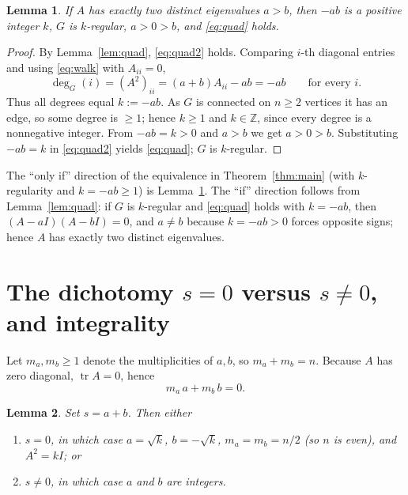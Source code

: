 \documentclass{amsart}
\newtheorem{lemma}{Lemma}
\theoremstyle{definition}
\begin{document}
\begin{lemma}\label{lem:regular}
If $A$ has exactly two distinct eigenvalues $a>b$, then $-ab$ is a positive
integer $k$, $G$ is $k$-regular, $a>0>b$, and \eqref{eq:quad} holds.
\end{lemma}

\begin{proof}
By Lemma~\ref{lem:quad}, \eqref{eq:quad2} holds. Comparing $i$-th diagonal
entries and using \eqref{eq:walk} with $A_{ii}=0$,
\[
\deg_G(i)=(A^2)_{ii}=(a+b)A_{ii}-ab=-ab\qquad\text{for every }i .
\]
Thus all degrees equal $k:=-ab$. As $G$ is connected on $n\ge2$ vertices it has
an edge, so some degree is $\ge1$; hence $k\ge1$ and $k\in\mathbb Z$, since
every degree is a nonnegative integer. From $-ab=k>0$ and $a>b$ we get
$a>0>b$. Substituting $-ab=k$ in \eqref{eq:quad2} yields \eqref{eq:quad}; $G$
is $k$-regular.
\end{proof}

The ``only if'' direction of the equivalence in Theorem~\ref{thm:main} (with
$k$-regularity and $k=-ab\ge1$) is Lemma~\ref{lem:regular}. The ``if''
direction follows from Lemma~\ref{lem:quad}: if $G$ is $k$-regular and
\eqref{eq:quad} holds with $k=-ab$, then $(A-aI)(A-bI)=0$, and $a\ne b$ because
$k=-ab>0$ forces opposite signs; hence $A$ has exactly two distinct
eigenvalues.

\section{The dichotomy $s=0$ versus $s\ne0$, and integrality}\label{sec:dichotomy}

Let $m_a,m_b\ge1$ denote the multiplicities of $a,b$, so $m_a+m_b=n$. Because
$A$ has zero diagonal, $\operatorname{tr}A=0$, hence
\begin{equation}\label{eq:trace}
m_a\,a+m_b\,b=0 .
\end{equation}

\begin{lemma}\label{lem:dichotomy}
Set $s=a+b$. Then either
\begin{enumerate}
\item[(I)] $s=0$, in which case $a=\sqrt k$, $b=-\sqrt k$, $m_a=m_b=n/2$ (so
$n$ is even), and $A^2=kI$; or
\item[(II)] $s\ne0$, in which case $a$ and $b$ are integers.
\end{enumerate}
\end{lemma}
\end{document}
